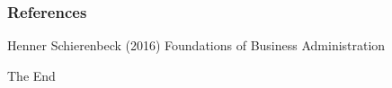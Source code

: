 \documentclass{beamer}
\begin{document}

\begin{frame}
\frametitle{References}
\footnotesize{
\begin{thebibliography}{99} %
 Henner Schierenbeck (2016)
\newblock Foundations of Business Administration
\end{thebibliography}
}
\end{frame}


\begin{frame}
\Huge{\centerline{The End}}
\end{frame}

\end{document}
